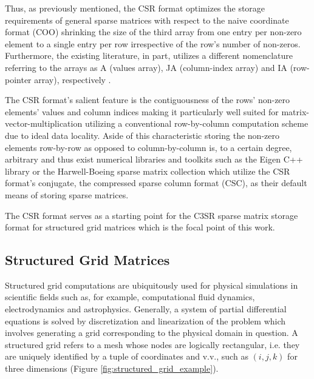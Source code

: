 \documentclass{article}
\begin{document}
    Thus, as previously mentioned, the CSR format optimizes the storage requirements of general sparse matrices with respect to the naive coordinate format (COO) shrinking the size of the third array from one entry per non-zero element to a single entry per row irrespective of the row's number of non-zeros. Furthermore, the existing literature, in part, utilizes a different nomenclature referring to the arrays as A (values array), JA (column-index array) and IA (row-pointer array), respectively \cite{sparskit}.

    The CSR format's salient feature is the contiguousness of the rows' non-zero elements' values and column indices making it particularly well suited for matrix-vector-multiplication utilizing a conventional row-by-column computation scheme due to ideal data locality. Aside of this characteristic storing the non-zero elements row-by-row as opposed to column-by-column is, to a certain degree, arbitrary and thus exist numerical libraries and toolkits such as the Eigen C++ library \cite{eigen:website} or the Harwell-Boeing sparse matrix collection \cite{harwell-boeing} which utilize the CSR format's conjugate, the compressed sparse column format (CSC), as their default means of storing sparse matrices.

    The CSR format serves as a starting point for the C3SR sparse matrix storage format for structured grid matrices which is the focal point of this work.

  \subsection{Structured Grid Matrices}

    Structured grid computations are ubiquitously used for physical simulations in scientific fields such as, for example, computational fluid dynamics, electrodynamics and astrophysics. Generally, a system of partial differential equations is solved by discretization and linearization of the problem which involves generating a grid corresponding to the physical domain in question. A structured grid refers to a mesh whose nodes are logically rectangular, i.e. they are uniquely identified by a tuple of coordinates and v.v., such as $(i, j, k)$ for three dimensions (Figure \ref{fig:structured_grid_example}).
\end{document}
